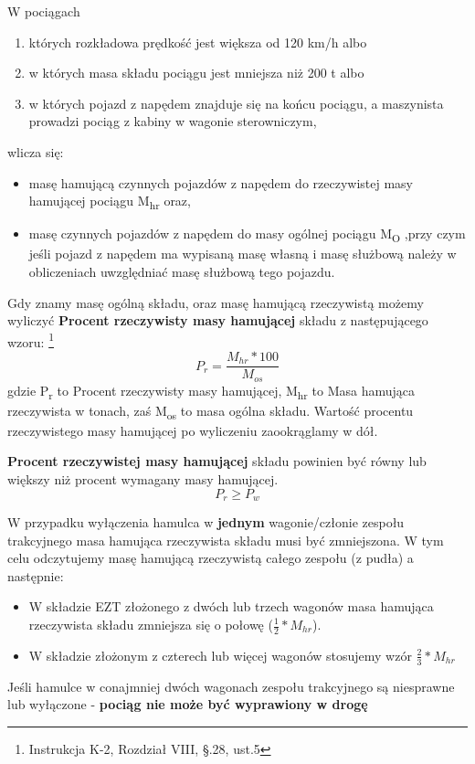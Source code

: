 \begin{tcolorbox}[colback=red!5!white,colframe=red!75!black,title=Uwaga!]
	W pociągach
	\begin{enumerate}
		\item których rozkładowa prędkość jest większa od 120 km/h albo
		\item w których masa składu pociągu jest mniejsza niż 200 t albo
		\item w których pojazd z napędem znajduje się na końcu pociągu, a maszynista prowadzi pociąg z kabiny w wagonie sterowniczym,
	\end{enumerate}
	wlicza się:
	\begin{itemize}
		\item masę hamującą czynnych pojazdów z napędem do rzeczywistej masy hamującej pociągu M\textsubscript{hr} oraz,
		\item masę czynnych pojazdów z napędem do masy ogólnej pociągu M\textsubscript{O} ,przy czym jeśli pojazd z napędem ma wypisaną masę własną i masę służbową należy w obliczeniach uwzględniać masę służbową tego pojazdu.
	\end{itemize}
	\label{def:masa}
\end{tcolorbox}

Gdy znamy masę ogólną składu, oraz masę hamującą rzeczywistą możemy wyliczyć \textbf{Procent rzeczywisty masy hamującej} składu z następującego wzoru: 
\footnote{Instrukcja K-2, Rozdział VIII, \S.28, ust.5}
\[  P_{r}=\frac{M_{hr}*100}{M_{os}}   \label{def:pr} \] 
gdzie P\textsubscript{r} to Procent rzeczywisty masy hamującej, M\textsubscript{hr} to Masa hamująca rzeczywista w tonach, zaś M\textsubscript{os} to masa ogólna składu. Wartość procentu rzeczywistego masy hamującej po wyliczeniu zaookrąglamy w dół.

\textbf{Procent rzeczywistej masy hamującej} składu powinien być równy lub większy niż procent wymagany masy hamującej.
\[  P_{r} \ge P_{w}   \] 

\begin{tcolorbox}[colback=green!15!white,colframe=green!75!black,title=Zmiana M\textsubscript{hr} po wyłączeniu hamulca zespołu trakcyjnego - wariant 1]
	W przypadku wyłączenia hamulca w \textbf{jednym} wagonie/członie zespołu trakcyjnego masa hamująca rzeczywista składu musi być zmniejszona. W tym celu odczytujemy masę hamującą rzeczywistą całego zespołu (z pudła) a następnie:
	\begin{itemize}
		\item W składzie EZT złożonego z dwóch lub trzech wagonów masa hamująca rzeczywista składu zmniejsza się o połowę ($ \frac{1}{2}*M_{hr} $).
		\item W składzie złożonym z czterech lub więcej wagonów stosujemy wzór $ \frac{2}{3}*M_{hr} $ 
	\end{itemize}
	Jeśli hamulce w conajmniej dwóch wagonach zespołu trakcyjnego są niesprawne lub wyłączone - \textbf{pociąg nie może być wyprawiony w drogę}	
\end{tcolorbox}


